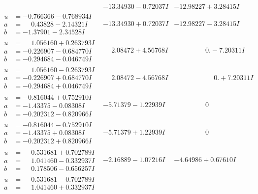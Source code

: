 \documentclass[1p]{elsarticle_modified}
\theoremstyle{definition}
\begin{document}
$$\begin{array}{c|c|c}
 & -13.34930 - 0.72037 I & -12.98227 + 3.28415 I \\ \hline\begin{aligned}
u &= -0.766366 - 0.768934 I \\
a &= \phantom{-}0.43828 - 2.14321 I \\
b &= -1.37901 - 2.34528 I\end{aligned}
 & -13.34930 + 0.72037 I & -12.98227 - 3.28415 I \\ \hline\begin{aligned}
u &= \phantom{-}1.056160 + 0.263793 I \\
a &= -0.226907 - 0.684770 I \\
b &= -0.294684 - 0.046749 I\end{aligned}
 & \phantom{-}2.08472 + 4.56768 I & \phantom{-0.000000 } 0. - 7.20311 I \\ \hline\begin{aligned}
u &= \phantom{-}1.056160 - 0.263793 I \\
a &= -0.226907 + 0.684770 I \\
b &= -0.294684 + 0.046749 I\end{aligned}
 & \phantom{-}2.08472 - 4.56768 I & \phantom{-0.000000 -}0. + 7.20311 I \\ \hline\begin{aligned}
u &= -0.816044 + 0.752910 I \\
a &= -1.43375 - 0.08308 I \\
b &= -0.202312 - 0.820966 I\end{aligned}
 & -5.71379 - 1.22939 I & \phantom{-0.000000 } 0 \\ \hline\begin{aligned}
u &= -0.816044 - 0.752910 I \\
a &= -1.43375 + 0.08308 I \\
b &= -0.202312 + 0.820966 I\end{aligned}
 & -5.71379 + 1.22939 I & \phantom{-0.000000 } 0 \\ \hline\begin{aligned}
u &= \phantom{-}0.531681 + 0.702789 I \\
a &= \phantom{-}1.041460 - 0.332937 I \\
b &= \phantom{-}0.178506 - 0.656257 I\end{aligned}
 & -2.16889 - 1.07216 I & -4.64986 + 0.67610 I \\ \hline\begin{aligned}
u &= \phantom{-}0.531681 - 0.702789 I \\
a &= \phantom{-}1.041460 + 0.332937 I \\

\end{aligned}
\end{array}$$
\end{document}
